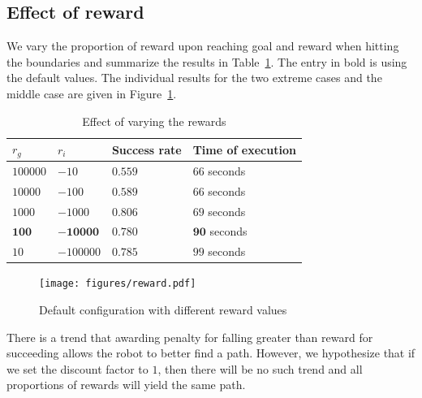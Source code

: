 \documentclass[10pt,a4paper,oneside]{article}
\begin{document}
\subsection{Effect of reward}

We vary the proportion of reward upon reaching goal and reward when hitting the
boundaries and summarize the results in
Table~\ref{tab:reward}. The entry in bold is using the default values.
The individual results for the two extreme cases and the middle case are given
in Figure~\ref{fig:reward}.

\begin{table}
\begin{center}
\begin{tabular}{|  l | l | l | l  |}
\hline
  $r_g$ & $r_i$ & \textbf{Success rate} & \textbf{Time of execution} \\ \hline \hline
  $100000$ & $-10$ & $0.559$ & $66$ seconds \\ \hline  %
  $10000$ & $-100$ & $0.589$ & $66$ seconds \\ \hline  %
  $1000 $ & $-1000$ & $0.806$ & $69$ seconds \\ \hline  %
  $\mathbf{100}$ & $\mathbf{-10000}$ & $\mathbf{0.780}$ & $\mathbf{90}$ seconds \\ \hline
  $10$ & $-100000$ & $0.785$ & $99$ seconds \\ \hline  %
\end{tabular}
\end{center}
\caption{Effect of varying the rewards}
\label{tab:reward}
\end{table}

%
%


\begin{figure}
\begin{center}
\texttt{[image: figures/reward.pdf]} 
\end{center}
\caption{Default configuration with different reward values}
\label{fig:reward}
\end{figure}
There is a trend that awarding penalty for falling greater than reward for
succeeding allows the robot to better find a path. However, we hypothesize that
if we set the discount factor to $1$, then there will be no such trend and all
proportions of rewards will yield the same path.
\end{document}
